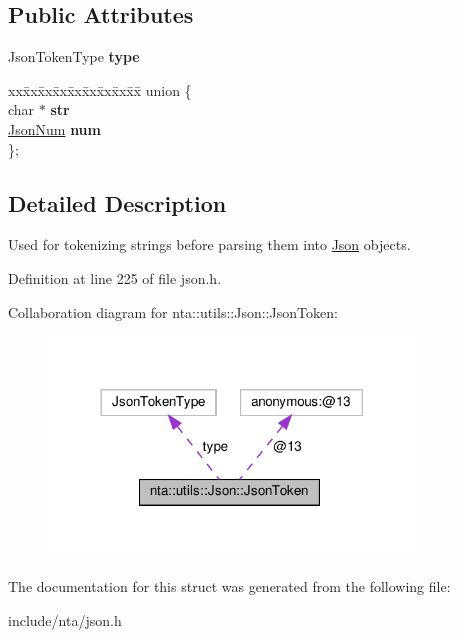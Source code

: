 \subsection*{Public Attributes}
\begin{DoxyCompactItemize}
\item 
\mbox{\label{structnta_1_1utils_1_1Json_1_1JsonToken_ab0bf0cda189a3063f326abcbf57532bb}} 
Json\+Token\+Type {\bfseries type}
\item 
\mbox{\label{structnta_1_1utils_1_1Json_1_1JsonToken_a7123d444ecb1662248a2b54d4f27d087}} 
\begin{tabbing}
xx\=xx\=xx\=xx\=xx\=xx\=xx\=xx\=xx\=\kill
union \{\\
\mbox{\label{structnta_1_1utils_1_1Json_1_1JsonToken_a249048bb34d397d9f9034391f07e8666}} 
char $\ast$ {\bfseries str}\\
\mbox{\label{structnta_1_1utils_1_1Json_1_1JsonToken_a276868d3bfc600a8e9b00a9719d09122}} 
\hyperlink{classnta_1_1utils_1_1JsonNum}{JsonNum} {\bfseries num}\\
\}; \\

\end{tabbing}\end{DoxyCompactItemize}


\subsection{Detailed Description}
Used for tokenizing strings before parsing them into \hyperlink{classnta_1_1utils_1_1Json}{Json} objects. 

Definition at line 225 of file json.\+h.



Collaboration diagram for nta\+:\+:utils\+:\+:Json\+:\+:Json\+Token\+:\nopagebreak
\begin{figure}[H]
\begin{center}
\leavevmode
\includegraphics[width=276pt]{d9/d6a/structnta_1_1utils_1_1Json_1_1JsonToken__coll__graph}
\end{center}
\end{figure}


The documentation for this struct was generated from the following file\+:\begin{DoxyCompactItemize}
\item 
include/nta/json.\+h\end{DoxyCompactItemize}
